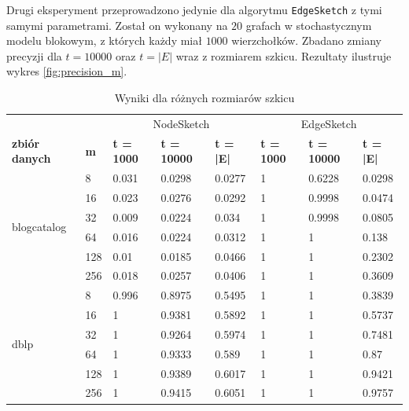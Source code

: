     Drugi eksperyment przeprowadzono jedynie dla algorytmu \texttt{EdgeSketch} z tymi samymi parametrami. Został on wykonany na $20$ grafach w stochastycznym modelu blokowym, z których każdy miał $1000$ wierzchołków. Zbadano zmiany precyzji dla $t = 10000$ oraz $t = |E|$ wraz z rozmiarem szkicu. Rezultaty ilustruje wykres \ref{fig:precision_m}.
    \begin{table}[!ht]
        \small
        \centering
        \begin{tabular}{|l|l|l|l|l|l|l|l|}
        \hline
        & & \multicolumn{3}{c|}{NodeSketch} & \multicolumn{3}{c|}{EdgeSketch} \\ \cline{1-8}
                \textbf{zbiór danych} & \textbf{m} & \textbf{t = 1000} & \textbf{t = 10000} & \textbf{t = |E|} & \textbf{t = 1000} & \textbf{t = 10000} & \textbf{t = |E|} \\ \hline\hline
        \multirow{6}{*}{blogcatalog} & 8 & 0.031 & 0.0298 & 0.0277 & 1 & 0.6228 & 0.0298 \\ \cline{2-8}
            & 16 & 0.023 & 0.0276 & 0.0292 & 1 & 0.9998 & 0.0474 \\ \cline{2-8}
            & 32 & 0.009 & 0.0224 & 0.034 & 1 & 0.9998 & 0.0805 \\ \cline{2-8}
            & 64 & 0.016 & 0.0224 & 0.0312 & 1 & 1 & 0.138 \\ \cline{2-8}
            & 128 & 0.01 & 0.0185 & 0.0466 & 1 & 1 & 0.2302 \\ \cline{2-8}
            & 256 & 0.018 & 0.0257 & 0.0406 & 1 & 1 & 0.3609 \\ \hline\hline
        \multirow{6}{*}{dblp} & 8 & 0.996 & 0.8975 & 0.5495 & 1 & 1 & 0.3839 \\ \cline{2-8}
            & 16 & 1 & 0.9381 & 0.5892 & 1 & 1 & 0.5737 \\ \cline{2-8}
            & 32 & 1 & 0.9264 & 0.5974 & 1 & 1 & 0.7481 \\ \cline{2-8}
            & 64 & 1 & 0.9333 & 0.589 & 1 & 1 & 0.87 \\ \cline{2-8}
            & 128 & 1 & 0.9389 & 0.6017 & 1 & 1 & 0.9421 \\ \cline{2-8}
            & 256 & 1 & 0.9415 & 0.6051 & 1 & 1 & 0.9757 \\ \hline
        \end{tabular}
        \caption{Wyniki dla różnych rozmiarów szkicu}
        \label{tab:sketch_size}
    \end{table}

